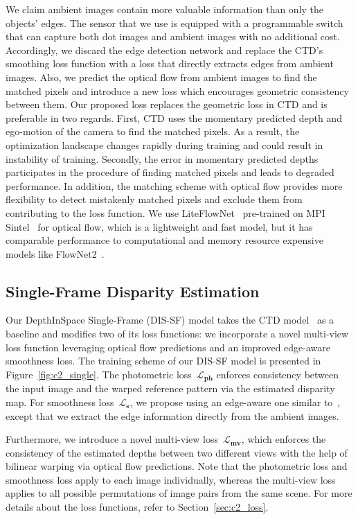 We claim ambient images contain more valuable information than only the objects' edges. The sensor that we use is equipped with a programmable switch that can capture both dot images and ambient images with no additional cost. Accordingly, we discard the edge detection network and replace the CTD's smoothing loss function with a loss that directly extracts edges from ambient images. Also, we predict the optical flow from ambient images to find the matched pixels and introduce a new loss which encourages geometric consistency between them. Our proposed loss replaces the geometric loss in CTD and is preferable in two regards. First, CTD uses the momentary predicted depth and ego-motion of the camera to find the matched pixels. As a result, the optimization landscape changes rapidly during training and could result in instability of training. Secondly, the error in momentary predicted depths participates in the procedure of finding matched pixels and leads to degraded performance. In addition, the matching scheme with optical flow provides more flexibility to detect mistakenly matched pixels and exclude them from contributing to the loss function. We use LiteFlowNet~\cite{hui2018liteflownet} pre-trained on MPI Sintel~\cite{butler2012naturalistic} for optical flow, which is a lightweight and fast model, but it has comparable performance to computational and memory resource expensive models like FlowNet2~\cite{ilg2017flownet}.

\subsection{Single-Frame Disparity Estimation} \label{sec:c2_single-frame}

Our DepthInSpace Single-Frame (DIS-SF) model takes the CTD model~\cite{riegler2019connecting} as a baseline and modifies two of its loss functions: we incorporate a novel multi-view loss function leveraging optical flow predictions and an improved edge-aware smoothness loss. The training scheme of our DIS-SF model is presented in Figure~\ref{fig:c2_single}. The photometric loss~$\boldsymbol{\mathcal{L}_{ph}}$ enforces consistency between the input image and the warped reference pattern via the estimated disparity map. For smoothness loss~$\boldsymbol{\mathcal{L}_{s}}$, we propose using an edge-aware one similar to~\cite{godard2017unsupervised, godard2019digging, pillai2019superdepth}, except that we extract the edge information directly from the ambient images.

Furthermore, we introduce a novel multi-view loss~$\boldsymbol{\mathcal{L}_{mv}}$, which enforces the consistency of the estimated depths between two different views with the help of bilinear warping via optical flow predictions. Note that the photometric loss and smoothness loss apply to each image individually, whereas the multi-view loss applies to all possible permutations of image pairs from the same scene. For more details about the loss functions, refer to Section~\ref{sec:c2_loss}.


